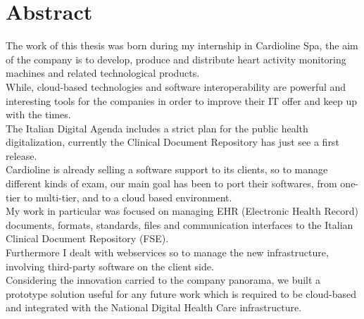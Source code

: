 \chapter*{Abstract} %
\label{sommario}

The work of this thesis was born during my internship in Cardioline Spa, the aim of the company is to develop, produce and distribute heart activity monitoring machines and related technological products.\\While, cloud-based technologies and software interoperability are powerful and interesting tools for the companies in order to improve their IT offer and keep up with the times.\\The Italian Digital Agenda includes a strict plan for the public health digitalization, currently the Clinical Document Repository has just see a first release.\\Cardioline is already selling a software support to its clients, so to manage different kinds of exam, our main goal has been to port their softwares, from one-tier to multi-tier, and to a cloud based environment.\\My work in particular was focused on managing EHR (Electronic Health Record) documents, formats, standards, files and communication interfaces to the Italian Clinical Document Repository (FSE).\\Furthermore I dealt with webservices so to manage the new infrastructure, involving third-party software on the client side.\\Considering the innovation carried to the company panorama, we built a prototype solution useful for any future work which is required to be cloud-based and integrated with the National Digital Health Care infrastructure.




